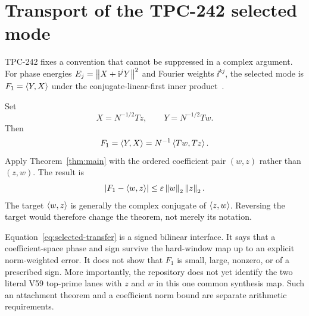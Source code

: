\section{Transport of the TPC-242 selected mode}\label{sec:transport}

TPC-242 fixes a convention that cannot be suppressed in a complex argument.
For phase energies $E_j=\left\lVert X+\mathrm{i}^jY\right\rVert^2$ and Fourier weights $\ii^{kj}$,
the selected mode is $F_1=\left\langle Y,X\right\rangle$ under the conjugate-linear-first inner
product~\cite{WangTPC242}.

Set
\[
X=N^{-1/2}Tz,\qquad Y=N^{-1/2}Tw.
\]
Then
\[
F_1=\left\langle Y,X\right\rangle=N^{-1}\left\langle Tw,Tz\right\rangle.
\]
Apply Theorem~\ref{thm:main} with the ordered coefficient pair $(w,z)$ rather
than $(z,w)$.  The result is
\begin{equation}\label{eq:selected-transfer}
\left\lvert F_1-\left\langle w,z\right\rangle\right\rvert
\leq\varepsilon\left\lVert w\right\rVert_2\left\lVert z\right\rVert_2.
\end{equation}
The target $\left\langle w,z\right\rangle$ is generally the complex conjugate of
$\left\langle z,w\right\rangle$.  Reversing the target would therefore change the theorem, not
merely its notation.

Equation~\eqref{eq:selected-transfer} is a signed bilinear interface.  It says
that a coefficient-space phase and sign survive the hard-window map up to an
explicit norm-weighted error.  It does not show that $F_1$ is small, large,
nonzero, or of a prescribed sign.  More importantly, the repository does not
yet identify the two literal V59 top-prime lanes with $z$ and $w$ in this one
common synthesis map.  Such an attachment theorem and a coefficient norm
bound are separate arithmetic requirements.
